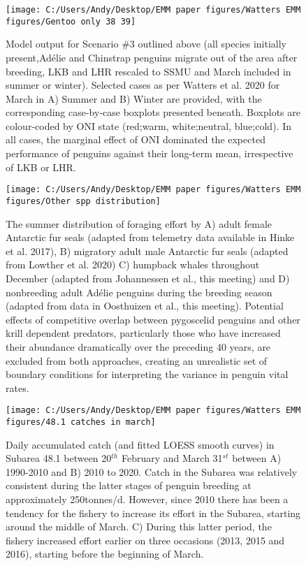\documentclass[]{elsarticle} %
\begin{document}
\begin{figure}

\texttt{[image: C:/Users/Andy/Desktop/EMM paper figures/Watters EMM figures/Gentoo only 38 39]} \hfill{}

\caption{Model output for Scenario \#3 outlined above (all species initially present,Adélie and Chinstrap penguins migrate out of the area after breeding, LKB and LHR rescaled to SSMU and March included in summer or winter).   Selected cases as per Watters et al. 2020 for March in A) Summer and B) Winter are provided, with the corresponding case-by-case boxplots presented beneath.  Boxplots are colour-coded by ONI state (red;warm, white;neutral, blue;cold).  In all cases, the marginal effect of ONI dominated the expected performance of penguins against their long-term mean, irrespective of LKB or LHR.}\label{fig:Scenario plot 3}
\end{figure}

\begin{figure}
\texttt{[image: C:/Users/Andy/Desktop/EMM paper figures/Watters EMM figures/Other spp distribution]} \caption{The summer distribution of foraging effort by A) adult female Antarctic fur seals (adapted from telemetry data available in Hinke et al. 2017), B) migratory adult male Antarctic fur seals (adapted from Lowther et al. 2020) C) humpback whales throughout December (adapted from Johannessen et al., this meeting) and D) nonbreeding adult Adélie penguins during the breeding season (adapted from data in Oosthuizen et al., this meeting). Potential effects of competitive overlap between pygoscelid penguins and other krill dependent predators, particularly those who have increased their abundance dramatically over the preceding 40 years, are excluded from both approaches, creating an unrealistic set of boundary conditions for interpreting the variance in penguin vital rates.}\label{fig:other species plots}
\end{figure}

\begin{figure}
\texttt{[image: C:/Users/Andy/Desktop/EMM paper figures/Watters EMM figures/48.1 catches in march]} \caption{Daily accumulated catch (and fitted LOESS smooth curves) in Subarea 48.1 between 20$^{th}$ February and March 31$^{st}$ between A) 1990-2010 and B) 2010 to 2020. Catch in the Subarea was relatively consistent during the latter stages of penguin breeding at approximately 250tonnes/d.  However, since 2010 there has been a tendency for the fishery to increase its effort in the Subarea, starting around the middle of March. C) During this latter period, the fishery increased effort earlier on three occasions (2013, 2015 and 2016), starting before the beginning of March.}\label{fig:March Subarea 48.1 fishing plot}
\end{figure}
\end{document}
